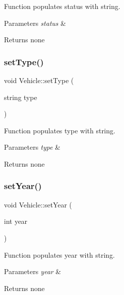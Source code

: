 Function populates status with string. 
\begin{DoxyParams}{Parameters}
{\em status} & \\
\hline
\end{DoxyParams}
\begin{DoxyReturn}{Returns}
none 
\end{DoxyReturn}
\mbox{\label{class_vehicle_a053568fb129b4294a82553d68880b07a}} 
\subsubsection{\texorpdfstring{set\+Type()}{setType()}}
{\footnotesize\ttfamily void Vehicle\+::set\+Type (\begin{DoxyParamCaption}\item[{string}]{type }\end{DoxyParamCaption})}

Function populates type with string. 
\begin{DoxyParams}{Parameters}
{\em type} & \\
\hline
\end{DoxyParams}
\begin{DoxyReturn}{Returns}
none 
\end{DoxyReturn}
\mbox{\label{class_vehicle_a8f26a947749fc447adbfb48b3bf5f289}} 
\subsubsection{\texorpdfstring{set\+Year()}{setYear()}}
{\footnotesize\ttfamily void Vehicle\+::set\+Year (\begin{DoxyParamCaption}\item[{int}]{year }\end{DoxyParamCaption})}

Function populates year with string. 
\begin{DoxyParams}{Parameters}
{\em year} & \\
\hline
\end{DoxyParams}
\begin{DoxyReturn}{Returns}
none 
\end{DoxyReturn}
\mbox{\label{class_vehicle_abd9381537867c1a98430ab06ce51898f}} 
